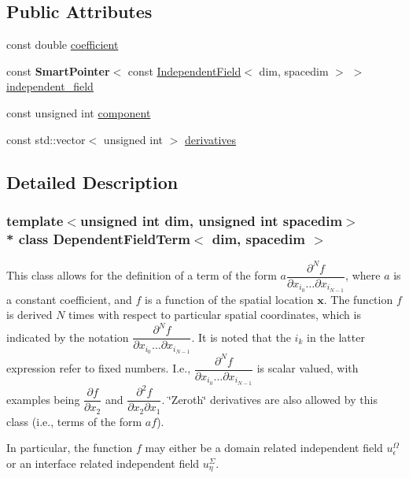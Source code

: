 \subsection*{Public Attributes}
\begin{DoxyCompactItemize}
\item 
const double \hyperlink{class_dependent_field_term_a59a9183a32ac55fb728f3797b68a9f8f}{coefficient}
\item 
const {\bf Smart\+Pointer}$<$ const \hyperlink{class_independent_field}{Independent\+Field}$<$ dim, spacedim $>$ $>$ \hyperlink{class_dependent_field_term_a89d1c3fea36e6fe105232097a321e095}{independent\+\_\+field}
\item 
const unsigned int \hyperlink{class_dependent_field_term_ac6f3ac40d4ee2c8b9f9bbdfa34079b74}{component}
\item 
const std\+::vector$<$ unsigned int $>$ \hyperlink{class_dependent_field_term_af09c5452c3e8e71e9ee99db304b90135}{derivatives}
\end{DoxyCompactItemize}


\subsection{Detailed Description}
\subsubsection*{template$<$unsigned int dim, unsigned int spacedim$>$\\*
class Dependent\+Field\+Term$<$ dim, spacedim $>$}

This class allows for the definition of a term of the form $a \dfrac{\partial^N f}{\partial x_{i_0} \hdots \partial x_{i_{N-1}}} $, where $a$ is a constant coefficient, and $f$ is a function of the spatial location $\boldsymbol{x}$. The function $f$ is derived $N$ times with respect to particular spatial coordinates, which is indicated by the notation $\dfrac{\partial^N f}{\partial x_{i_0} \hdots \partial x_{i_{N-1}}}$. It is noted that the $i_k$ in the latter expression refer to fixed numbers. I.\+e., $\dfrac{\partial^N f}{\partial x_{i_0} \hdots \partial x_{i_{N-1}}}$ is scalar valued, with examples being $\dfrac{\partial f}{\partial x_2}$ and $\dfrac{\partial^2 f}{\partial x_2 \partial x_1}$. \char`\"{}\+Zeroth\char`\"{} derivatives are also allowed by this class (i.\+e., terms of the form $a f$).

In particular, the function $f$ may either be a domain related independent field $u^\Omega_\epsilon$ or an interface related independent field $u^\Sigma_\eta$.


